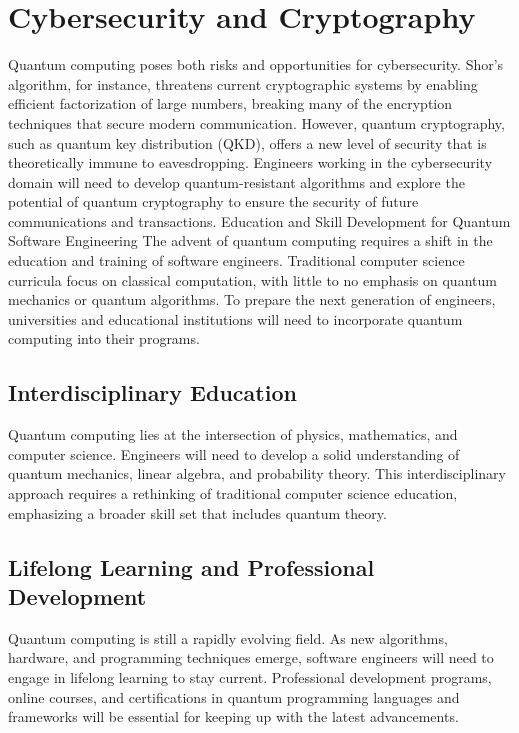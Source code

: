 \documentclass{article}
\begin{document}
\section{Cybersecurity and Cryptography}

Quantum computing poses both risks and opportunities for cybersecurity. Shor’s algorithm, for instance, threatens current cryptographic systems by enabling efficient factorization of large numbers, breaking many of the encryption techniques that secure modern communication. However, quantum cryptography, such as quantum key distribution (QKD), offers a new level of security that is theoretically immune to eavesdropping.
Engineers working in the cybersecurity domain will need to develop quantum-resistant algorithms and explore the potential of quantum cryptography to ensure the security of future communications and transactions.
Education and Skill Development for Quantum Software Engineering
The advent of quantum computing requires a shift in the education and training of software engineers. Traditional computer science curricula focus on classical computation, with little to no emphasis on quantum mechanics or quantum algorithms. To prepare the next generation of engineers, universities and educational institutions will need to incorporate quantum computing into their programs.

\subsection{Interdisciplinary Education}

Quantum computing lies at the intersection of physics, mathematics, and computer science. Engineers will need to develop a solid understanding of quantum mechanics, linear algebra, and probability theory. This interdisciplinary approach requires a rethinking of traditional computer science education, emphasizing a broader skill set that includes quantum theory.

\subsection{Lifelong Learning and Professional Development}
 
Quantum computing is still a rapidly evolving field. As new algorithms, hardware, and programming techniques emerge, software engineers will need to engage in lifelong learning to stay current. Professional development programs, online courses, and certifications in quantum programming languages and frameworks will be essential for keeping up with the latest advancements.
\end{document}
